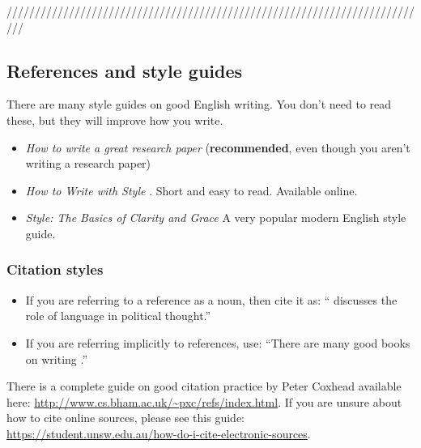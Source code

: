 \documentclass{l4proj}
\begin{document}
///////////////////////////////////////////////////////////////////////////

\subsection{References and style guides}
There are many style guides on good English writing. You don't need to
read these, but they will improve how you write.

\begin{itemize}
  \item
  \emph{How to write a great research paper} \cite{Pey17} (\textbf{recommended}, even though you aren't writing a research paper)
  \item
  \emph{How to Write with Style} \cite{Von80}. Short and easy to read. Available online.
  \item
  \emph{Style: The Basics of Clarity and Grace} \cite{Wil09} A very popular modern English style guide.
\end{itemize}

\subsubsection{Citation styles}

\begin{itemize}
\item If you are referring to a reference as a noun, then cite it as: ``\citet{Orw68} discusses the role of language in political thought.''
\item If you are referring implicitly to references, use: ``There are many good books on writing \citep{Orw68, Wil09, Pin15}.''
\end{itemize}

There is a complete guide on good citation practice by Peter Coxhead available here: \url{http://www.cs.bham.ac.uk/~pxc/refs/index.html}. 
If you are unsure about how to cite online sources, please see this guide: \url{https://student.unsw.edu.au/how-do-i-cite-electronic-sources}.

%
% 
\end{document}

